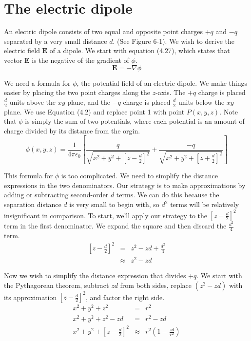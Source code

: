 \section{The electric dipole}

An electric dipole consists of two equal and opposite point charges $+q$ and $-q$
separated by a very small distance $d$. (See Figure 6-1).
We wish to derive the electric field $\boldsymbol{E}$ of a dipole.
We start with equation (4.27), which states that
vector $\boldsymbol{E}$ is the negative of the gradient of $\phi$.
\[ \boldsymbol{E} = -\nabla\phi \]

We need a formula for $\phi$, the potential field of an electric dipole.
We make things easier by placing the two point charges along the $z$-axis.
The $+q$ charge is placed $\frac{d}{2}$ units above the $xy$ plane, and
the $-q$ charge is placed $\frac{d}{2}$ units below the $xy$ plane.
We use Equation (4.2) and replace point 1 with point $P(x,y,z)$.
Note that $\phi$ is simply the sum of two potentials,
where each potential is an amount of charge divided by its distance from the orgin.
\begin{equation}
\phi(x,y,z) =
\frac{1}{4\pi\epsilon_0}
\left[
\frac{ q}{\sqrt{x^2 + y^2 + \left[z - \frac{d}{2}\right]^2}} + 
\frac{-q}{\sqrt{x^2 + y^2 + \left[z + \frac{d}{2}\right]^2}}
\right]
\end{equation}

This formula for $\phi$ is too complicated.
We need to simplify the distance expressions in the two denominators.
Our strategy is to make approximations by adding or subtracting second-order $d$ terms.
We can do this because the separation distance $d$ is very small to begin with, 
so $d^2$ terms will be relatively insignificant in comparison.  To start,
we'll apply our strategy to the $[z-\frac{d}{2}]^2$ term in the first denominator.
We expand the square and then discard the $\frac{d^2}{4}$ term.
\begin{eqnarray}
  \left[z-\frac{d}{2}\right]^2  &=&  z^2 - zd + \frac{d^2}{4}  \nonumber\\
  &\approx& z^2 - zd \nonumber
\end{eqnarray}

Now we wish to simplify the distance expression that divides $+q$.
We start with the Pythagorean theorem, subtract $zd$ from both sides,
replace $(z^2 - zd)$ with its approximation $[z-\frac{d}{2}]^2$,
and factor the right side.
\begin{eqnarray*}
 x^2 + y^2 + z^2 &=& r^2 \\
 x^2 + y^2 + z^2 - zd &=& r^2 - zd \\
 x^2 + y^2 + \left[z-\frac{d}{2}\right]^2 &\approx& r^2 \left( 1 - \frac{zd}{r^2} \right)
\end{eqnarray*}

